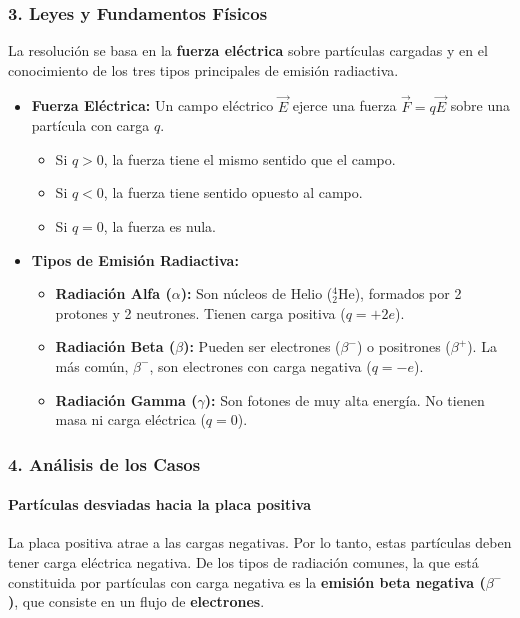 \subsubsection*{3. Leyes y Fundamentos Físicos}
La resolución se basa en la \textbf{fuerza eléctrica} sobre partículas cargadas y en el conocimiento de los tres tipos principales de emisión radiactiva.
\begin{itemize}
    \item \textbf{Fuerza Eléctrica:} Un campo eléctrico $\vec{E}$ ejerce una fuerza $\vec{F} = q\vec{E}$ sobre una partícula con carga $q$.
    \begin{itemize}
        \item Si $q > 0$, la fuerza tiene el mismo sentido que el campo.
        \item Si $q < 0$, la fuerza tiene sentido opuesto al campo.
        \item Si $q = 0$, la fuerza es nula.
    \end{itemize}
    \item \textbf{Tipos de Emisión Radiactiva:}
    \begin{itemize}
        \item \textbf{Radiación Alfa ($\alpha$):} Son núcleos de Helio ($^4_2\text{He}$), formados por 2 protones y 2 neutrones. Tienen carga positiva ($q=+2e$).
        \item \textbf{Radiación Beta ($\beta$):} Pueden ser electrones ($\beta^-$) o positrones ($\beta^+$). La más común, $\beta^-$, son electrones con carga negativa ($q=-e$).
        \item \textbf{Radiación Gamma ($\gamma$):} Son fotones de muy alta energía. No tienen masa ni carga eléctrica ($q=0$).
    \end{itemize}
\end{itemize}

\subsubsection*{4. Análisis de los Casos}
\paragraph{Partículas desviadas hacia la placa positiva}
La placa positiva atrae a las cargas negativas. Por lo tanto, estas partículas deben tener carga eléctrica negativa. De los tipos de radiación comunes, la que está constituida por partículas con carga negativa es la \textbf{emisión beta negativa ($\beta^-$)}, que consiste en un flujo de \textbf{electrones}.

